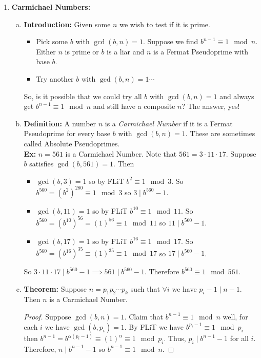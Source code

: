 \documentclass[class=article, crop=false]{standalone}
\begin{document}
\begin{enumerate}[1.]
	\item \textbf{Carmichael Numbers:}
		\begin{enumerate}[(a)]
			\item \textbf{Introduction:}
				Given some $n$ we wish to test if it is prime.
				\begin{itemize}
					\item Pick some $b$ with $\gcd(b,n)=1$.
						Suppose we find $b^{n-1} \equiv 1\mod n$.
						Either $n$ is prime or $b$ is a liar and $n$ is a Fermat
						Pseudoprime with base $b$.
					
					\item Try another $b$ with $\gcd(b,n)=1\cdots$
				\end{itemize}
				So, is it possible that we could try all $b$ with $\gcd(b,n)=1$
				and always get $b^{n-1}\equiv 1\mod n$ and still have a composite $n$?
				The answer, yes!
			
			\item \textbf{Definition:}
				A number $n$ is a \emph{Carmichael Number} if it is a Fermat Pseudoprime for
				every base $b$ with $\gcd(b,n)=1$. These are sometimes called Absolute Pseudoprimes.\\
				\textbf{Ex:} $n=561$ is a Carmichael Number. Note that $561=3\cdot 11\cdot 17$.
				Suppose $b$ satisfies $\gcd(b,561)=1$. Then
				\begin{itemize}
					\item $\gcd(b,3)=1$ so by FLiT $b^2 \equiv 1\mod 3$. So $b^{560}=(b^2)^{280}\equiv 1\mod 3$
						so $3\mid b^{560}-1$.
					\item $\gcd(b,11)=1$ so by FLiT $b^{10}\equiv 1\mod 11$. So
						$b^{560}=(b^{10})^{56}=(1)^{56}\equiv 1\mod 11$ so $11\mid b^{560}-1$.
					\item $\gcd(b,17)=1$ so by FLiT $b^{16}\equiv 1\mod 17$. So
						$b^{560}=(b^{16})^{35}\equiv(1)^{35}\equiv 1\mod 17$ so $17\mid b^{560}-1$.
				\end{itemize}
				So $3\cdot 11\cdot 17\mid b^{560}-1 \implies 561\mid b^{560}-1$. Therefore $b^{560}\equiv 1\mod 561$.

			\item \textbf{Theorem:}
				Suppose $n=p_1 p_2\cdots p_k$ such that $\forall i$ we have $p_i -1\mid n-1$.
				Then $n$ is a Carmichael Number.
				\begin{proof}
					Suppose $\gcd(b,n)=1$. Claim that $b^{n-1}\equiv 1\mod n$ well, for each $i$ we have
					$\gcd(b, p_i)=1$. By FLiT we have $b^{p_i -1} \equiv 1\mod p_i$ then
					$b^{n-1}=b^{\alpha(p_i-1)}\equiv (1)^{\alpha}\equiv 1\mod p_i$. Thus,
					$p_i\mid b^{n-1}-1$ for all $i$. Therefore, $n\mid b^{n-1}-1$ so 
					$b^{n-1}\equiv 1\mod n$.
				\end{proof}
				\noindent
		\end{enumerate}
\end{enumerate}
\end{document}
